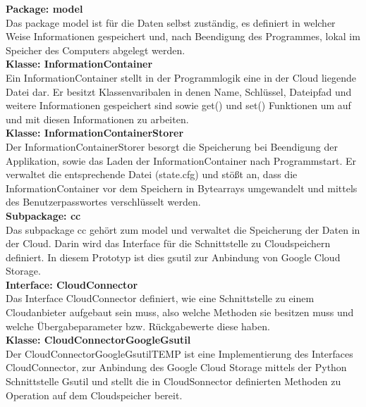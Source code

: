 \documentclass[12pt,a4paper,bibliography=totocnumbered,listof=totocnumbered]{scrartcl}
\begin{document}
\textbf{Package: model}\\
Das package model ist für die Daten selbst zuständig, es definiert in welcher Weise Informationen gespeichert und, nach Beendigung des Programmes, lokal im Speicher des Computers abgelegt werden.\\
\textbf{Klasse: InformationContainer}\\
Ein InformationContainer stellt in der Programmlogik eine in der Cloud liegende Datei dar. Er besitzt Klassenvaribalen in denen Name, Schlüssel, Dateipfad und weitere Informationen gespeichert sind sowie get() und set() Funktionen um auf und mit diesen Informationen zu arbeiten.\\
\textbf{Klasse: InformationContainerStorer}\\
Der InformationContainerStorer besorgt die Speicherung bei Beendigung der Applikation, sowie das Laden der InformationContainer nach Programmstart. Er verwaltet die entsprechende Datei (state.cfg) und stößt an, dass die  InformationContainer vor dem Speichern in Bytearrays umgewandelt und mittels des Benutzerpasswortes verschlüsselt werden.\\
\textbf{Subpackage: cc}\\
Das subpackage cc gehört zum model und verwaltet die Speicherung der Daten in der Cloud. Darin wird das Interface für die Schnittstelle zu Cloudspeichern definiert. In diesem Prototyp ist dies gsutil zur Anbindung von Google Cloud Storage.\\
\textbf{Interface: CloudConnector}\\
Das Interface CloudConnector definiert, wie eine Schnittstelle zu einem Cloudanbieter aufgebaut sein muss, also welche Methoden sie besitzen muss und welche Übergabeparameter bzw. Rückgabewerte diese haben.\\
\textbf{Klasse: CloudConnectorGoogleGsutil}\\
Der CloudConnectorGoogleGsutilTEMP ist eine Implementierung des Interfaces CloudConnector, zur Anbindung des Google Cloud Storage mittels der Python Schnittstelle Gsutil und stellt die in CloudSonnector definierten Methoden zu Operation auf dem Cloudspeicher bereit.\\
\end{document}
